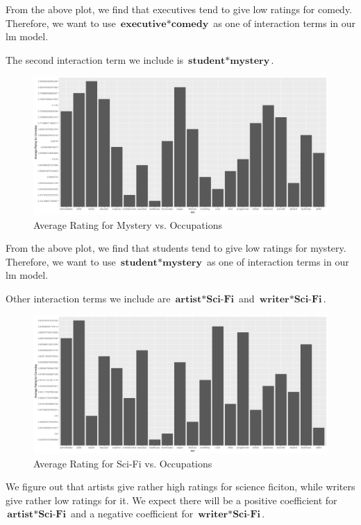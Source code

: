 \documentclass[11pt]{article}
\begin{document}
From the above plot, we find that executives tend to give low 
ratings for comedy. Therefore, we want to use $\textbf{executive} * \textbf{comedy}$ as 
one of interaction terms in our lm model.

The second interaction term we include is $\textbf{student} * \textbf{mystery}$.
\begin{figure}[ht!]
\begin{center}
\includegraphics[width=\textwidth]{mystrey_student.png}
\caption{Average Rating for Mystery vs. Occupations}
\end{center}
\end{figure}

From the above plot, we find that students tend to give low 
ratings for mystery. Therefore, we want to use $\textbf{student} * \textbf{mystery}$ as one of interaction terms in our lm model.
\clearpage

Other interaction terms we include are $\textbf{artist} * \textbf{Sci-Fi}$ and $\textbf{writer} * \textbf{Sci-Fi}$.
\begin{figure}[ht!]
\begin{center}
\includegraphics[width=\textwidth]{sci_fi.png}
\caption{Average Rating for Sci-Fi vs. Occupations}
\end{center}
\end{figure}
We figure out that artists give rather high ratings for science 
ficiton, while writers give rather low ratings for it. We expect
there will be a positive coefficient for $\textbf{artist} * \textbf{Sci-Fi}$ and a negative coefficient for $\textbf{writer} * \textbf{Sci-Fi}$.
\end{document}
